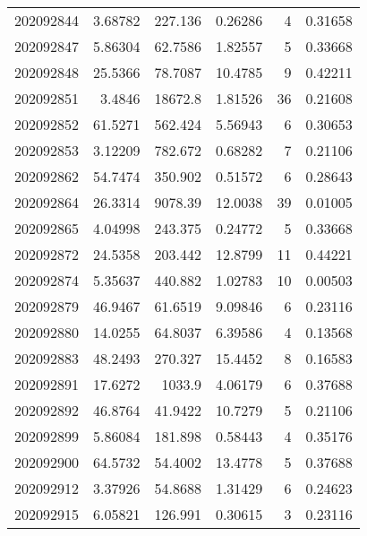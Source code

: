 \begin{tabular}{rrrrrr}
 202092844 &          3.68782 &      227.136  &            0.26286 &           4 & 0.31658 \\
 202092847 &          5.86304 &       62.7586 &            1.82557 &           5 & 0.33668 \\
 202092848 &         25.5366  &       78.7087 &           10.4785  &           9 & 0.42211 \\
 202092851 &          3.4846  &    18672.8    &            1.81526 &          36 & 0.21608 \\
 202092852 &         61.5271  &      562.424  &            5.56943 &           6 & 0.30653 \\
 202092853 &          3.12209 &      782.672  &            0.68282 &           7 & 0.21106 \\
 202092862 &         54.7474  &      350.902  &            0.51572 &           6 & 0.28643 \\
 202092864 &         26.3314  &     9078.39   &           12.0038  &          39 & 0.01005 \\
 202092865 &          4.04998 &      243.375  &            0.24772 &           5 & 0.33668 \\
 202092872 &         24.5358  &      203.442  &           12.8799  &          11 & 0.44221 \\
 202092874 &          5.35637 &      440.882  &            1.02783 &          10 & 0.00503 \\
 202092879 &         46.9467  &       61.6519 &            9.09846 &           6 & 0.23116 \\
 202092880 &         14.0255  &       64.8037 &            6.39586 &           4 & 0.13568 \\
 202092883 &         48.2493  &      270.327  &           15.4452  &           8 & 0.16583 \\
 202092891 &         17.6272  &     1033.9    &            4.06179 &           6 & 0.37688 \\
 202092892 &         46.8764  &       41.9422 &           10.7279  &           5 & 0.21106 \\
 202092899 &          5.86084 &      181.898  &            0.58443 &           4 & 0.35176 \\
 202092900 &         64.5732  &       54.4002 &           13.4778  &           5 & 0.37688 \\
 202092912 &          3.37926 &       54.8688 &            1.31429 &           6 & 0.24623 \\
 202092915 &          6.05821 &      126.991  &            0.30615 &           3 & 0.23116 \\

\end{tabular}
